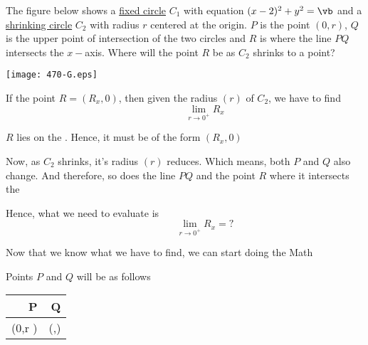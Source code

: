 \documentclass[14pt,fleqn]{extarticle}
\newcommand\va{2}
\newcommand\limit{\lim_{r\to 0^+}}
\newcommand\xq{\frac{r^2}{4}}
\newcommand\yq{\frac{r}{4}\sqrt{16-r^2}}
\begin{document}
 

\begin{question}
	\statement 

The figure below shows a \underline{fixed circle} $C_1$ with equation $(x-\va)^2 + y^2 = \vb$ and a \underline{shrinking circle} $C_2$ with radius $r$ centered at the origin. $P$ is the point $(0,r)$, $Q$ is the upper point of intersection of the two circles and $R$ is where the line $PQ$ intersects the $x-$axis. Where will the point $R$ be as $C_2$ shrinks to a point? 

\begin{center}
\texttt{[image: 470-G.eps]}
\end{center}

\begin{step}
  \begin{options} 
     \correct 
      
     If the point $R = \left(R_x,0 \right)$, then given the radius $(r)$ of $C_2$, we have to find 
     \[ \qquad\qquad \limit R_x \]
        
    \end{options} 
     \reason 
     
     $R$ lies on the \xaxis. Hence, it must be of the form $\left(R_x,0 \right)$ \newline
     
     Now, as $C_2$ shrinks, it's radius $(r)$ reduces. Which means, both $P$ and $Q$ also change. And therefore, so does the line $PQ$ and the point $R$ where it intersects the \xaxis \newline 
     
     Hence, what we need to evaluate is 
     \[ \qquad\qquad \limit R_x = ? \]
     
     Now that we know what we have to find, we can start doing the Math  
\end{step}
          
\begin{step}
  \begin{options} 
     \correct 
      
      Points $P$ and $Q$ will be as follows 
      
      \begin{center}
  \begin{tabular}{NN}
   \toprule
        P & Q \\
   \midrule 
   \left(0,r \right) & \left(\xq,\yq \right) \\
    \bottomrule
  \end{tabular}
\end{center}
       

\end{options}
\end{step}
\end{question}
\end{document}
